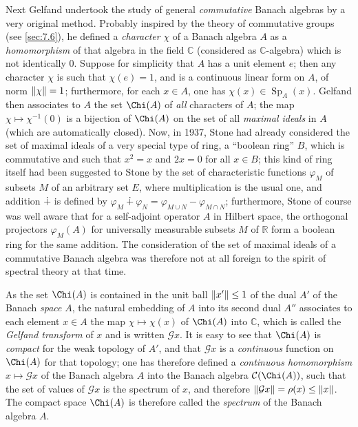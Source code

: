 \documentclass[12pt,a4paper,leqno,twoside]{extbook}
\DeclarePairedDelimiter{\norm}{\lVert}{\rVert}
\newcommand{\Cont}{\mathcal{C}}
\newcommand{\C}{\mathbb{C}}
\newcommand{\R}{\mathbb{R}}
\newcommand{\spec}{\operatorname{Sp}}
\begin{document}
Next Gelfand undertook the study of general \emph{commutative} Banach algebras by a very original method. Probably inspired by the theory of commutative groups (see \ref{sec:7.6}), he defined a \emph{character} \(\chi\) of a Banach algebra \(A\) as a \emph{homomorphism} of that algebra in the field \(\C\) (considered as \(\C\)-algebra) which is not identically 0. Suppose for simplicity that \(A\) has a unit element \(e\); then any character \(\chi\) is such that \(\chi(e) = 1\), and is a continuous linear form on \(A\), of norm \(\norm{\chi} = 1\); furthermore, for each \(x \in A\), one has \(\chi(x) \in \spec_A(x)\). Gelfand then associates to \(A\) the set \(\Chi(A)\) of \emph{all} characters of \(A\); the map \(\chi \mapsto \chi^{-1}(0)\) is a bijection of \(\Chi(A)\) on the set of all \emph{maximal ideals} in \(A\) (which are automatically closed). Now, in 1937, Stone \cite{208} had already considered the set of maximal ideals of a very special type of ring, a ``boolean ring'' \(B\), which is commutative and such that \(x^2 = x\) and \(2x = 0\) for all \(x \in B\); this kind of ring itself had been suggested to Stone by the set of characteristic functions \(\varphi_M\) of subsets \(M\) of an arbitrary set \(E\), where multiplication is the usual one, and addition \(\dotplus\) is defined by \(\varphi_M \dotplus \varphi_N = \varphi_{M \cup N} - \varphi_{M \cap N}\); furthermore, Stone of course was well aware that for a self-adjoint operator \(A\) in Hilbert space, the orthogonal projectors \(\varphi_M(A)\) for universally measurable subsets \(M\) of \(\R\) form a boolean ring for the same addition. The consideration of the set of maximal ideals of a commutative Banach algebra was therefore not at all foreign to the spirit of spectral theory at that time.

As the set \(\Chi(A)\) is contained in the unit ball \(\norm{x'} \leq 1\) of the dual \(A'\) of the Banach \emph{space} \(A\), the natural embedding of \(A\) into its second dual \(A''\) associates to each element \(x \in A\) the map \(\chi \mapsto \chi(x)\) of \(\Chi(A)\) into \(\C\), which is called the \emph{Gelfand transform} of \(x\) and is written \(\mathcal{G}x\). It is easy to see that \(\Chi(A)\) is \emph{compact} for the weak topology of \(A'\), and that \(\mathcal{G}x\) is a \emph{continuous} function on \(\Chi(A)\) for that topology; one has therefore defined a \emph{continuous homomorphism} \(x \mapsto \mathcal{G}x\) of the Banach algebra \(A\) into the Banach algebra \(\Cont(\Chi(A))\), such that the set of values of \(\mathcal{G}x\) is the spectrum of \(x\), and therefore \(\norm{\mathcal{G}x} = \rho(x) \leq \norm{x}\). The compact space \(\Chi(A)\) is therefore called the \emph{spectrum} of the Banach algebra \(A\).
\end{document}
